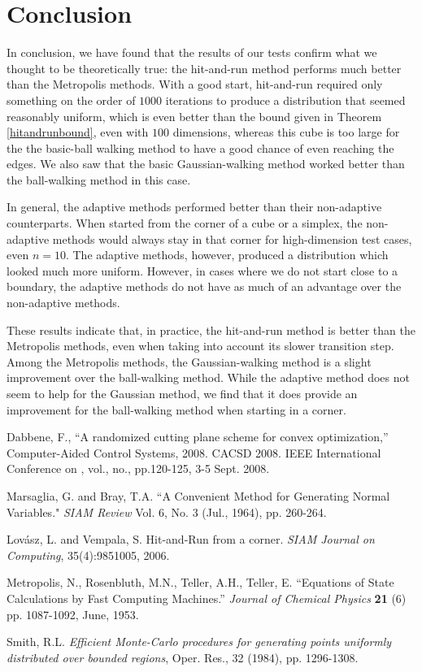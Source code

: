 \documentclass[11pt]{article}
\begin{document}
\section{Conclusion}

In conclusion, we have found that the results of our tests confirm what we thought to be theoretically true: the hit-and-run method performs much better than the Metropolis methods. With a good start, hit-and-run required only something on the order of $1000$ iterations to produce a distribution that seemed reasonably uniform, which is even better than the bound given in Theorem \ref{hitandrunbound}, even with $100$ dimensions, whereas this cube is too large for the the basic-ball walking method to have a good chance of even reaching the edges. We also saw that the basic Gaussian-walking method worked better than the ball-walking method in this case.

In general, the adaptive methods performed better than their non-adaptive counterparts. When started from the corner of a cube or a simplex, the non-adaptive methods would always stay in that corner for high-dimension test cases, even $n=10$. The adaptive methods, however, produced a distribution which looked much more uniform. However, in cases where we do not start close to a boundary, the adaptive methods do not have as much of an advantage over the non-adaptive methods.

These results indicate that, in practice, the hit-and-run method is better than the Metropolis methods, even when taking into account its slower transition step. Among the Metropolis methods, the Gaussian-walking method is a slight improvement over the ball-walking method. While the adaptive method does not seem to help for the Gaussian method, we find that it does provide an improvement for the ball-walking method when starting in a corner.

\pagebreak

\begin{thebibliography}{9}

 Dabbene, F., ``A randomized cutting plane scheme for convex optimization,'' Computer-Aided Control Systems, 2008. CACSD 2008. IEEE International Conference on , vol., no., pp.120-125, 3-5 Sept. 2008.

 Marsaglia, G. and Bray, T.A. ``A Convenient Method for Generating Normal Variables." \emph{SIAM Review} Vol. 6, No. 3 (Jul., 1964), pp. 260-264.

 Lov\'asz, L. and Vempala, S. Hit-and-Run from a corner. \emph{SIAM Journal on Computing}, 35(4):9851005, 2006.

 Metropolis, N., Rosenbluth, M.N., Teller, A.H., Teller, E. ``Equations of State Calculations by Fast Computing Machines.'' \emph{Journal of Chemical Physics} \textbf{21} (6) pp. 1087-1092, June, 1953.

 Smith, R.L. \emph{Efficient Monte-Carlo procedures for generating points uniformly distributed over
bounded regions}, Oper. Res., 32 (1984), pp. 1296-1308.

\end{thebibliography}
\end{document}
